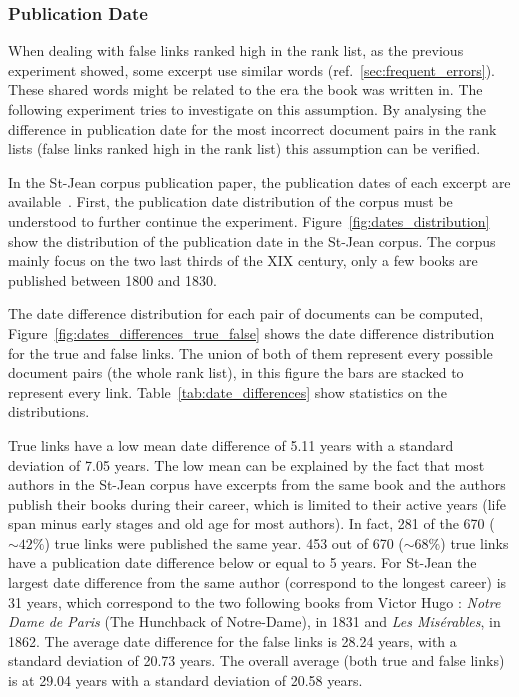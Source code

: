 \subsubsection{Publication Date}

When dealing with false links ranked high in the rank list, as the previous experiment showed, some excerpt use similar words (ref.~\ref{sec:frequent_errors}).
These shared words might be related to the era the book was written in.
The following experiment tries to investigate on this assumption.
By analysing the difference in publication date for the most incorrect document pairs in the rank lists (false links ranked high in the rank list) this assumption can be verified.

In the St-Jean corpus publication paper, the publication dates of each excerpt are available~\cite{st_jean}.
First, the publication date distribution of the corpus must be understood to further continue the experiment.
Figure~\ref{fig:dates_distribution} show the distribution of the publication date in the St-Jean corpus.
The corpus mainly focus on the two last thirds of the XIX century, only a few books are published between 1800 and 1830.

The date difference distribution for each pair of documents can be computed, Figure~\ref{fig:dates_differences_true_false} shows the date difference distribution for the true and false links.
The union of both of them represent every possible document pairs (the whole rank list), in this figure the bars are stacked to represent every link.
Table~\ref{tab:date_differences} show statistics on the distributions.

True links have a low mean date difference of 5.11 years with a standard deviation of 7.05 years.
The low mean can be explained by the fact that most authors in the St-Jean corpus have excerpts from the same book and the authors publish their books during their career, which is limited to their active years (life span minus early stages and old age for most authors).
In fact, 281 of the 670 ($\sim 42\%$) true links were published the same year.
453 out of 670 ($\sim 68\%$) true links have a publication date difference below or equal to 5 years.
For St-Jean the largest date difference from the same author (correspond to the longest career) is 31 years, which correspond to the two following books from Victor Hugo : \textit{Notre Dame de Paris} (The Hunchback of Notre-Dame), in 1831 and \textit{Les Misérables}, in 1862.
The average date difference for the false links is 28.24 years, with a standard deviation of 20.73 years.
The overall average (both true and false links) is at 29.04 years with a standard deviation of 20.58 years.

